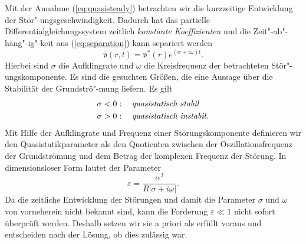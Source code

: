 \documentclass[10pt,a5paper,oneside,draft]{book}
\numberwithin{equation}{chapter}
\begin{document}
Mit der Annahme (\mbox{\ref{eq:quasisteady}}) betrachten wir die kurzzeitige Entwicklung der St\"or"-ungsgeschwindigkeit.
Dadurch hat das partielle Differentialgleichungssystem zeitlich \textit{konstante Koeffizienten} und die Zeit"-ab"-h\"ang"-ig"-keit aus (\mbox{\ref{eq:separation}}) kann separiert werden
\begin{equation}\label{eq:zeitansatz}
	\bar{\mathfrak{v}}(r,t) = \mathfrak{v}^{*}(r) e^{(\sigma + i\omega)t}.
\end{equation}
Hierbei sind $\sigma$ die Aufklingrate und $\omega$ die Kreisfrequenz der betrachteten St\"or"-ungskomponente.
Es sind die gesuchten Gr\"o\ss en, die eine Aussage \"uber die Stabilit\"at der Grundstr\"o"-mung liefern.
Es gilt
\begin{equation}\label{eq:quasistatisch:kriterium}
	\begin{split}
	\sigma &< 0:\quad\textrm{\textit{quasistatisch stabil}}\\
	\sigma &> 0:\quad\textrm{\textit{quasistatisch instabil}}.
	\end{split}
\end{equation}
Mit Hilfe der Aufklingrate und Frequenz einer St\"orungskomponente definieren wir den Quasistatikparameter als den Quotienten zwischen der Oszillationsfrequenz der Grundstr\"omung und dem Betrag der komplexen Frequenz der St\"orung.
In dimensionsloser Form lautet der Parameter
\begin{equation}\label{eq:epsilon}
	\varepsilon = \frac{\alpha^2}{R|\sigma+i\omega|}.
\end{equation}
Da die zeitliche Entwicklung der St\"orungen und damit die Parameter $\sigma$ und $\omega$ von vorneherein nicht bekannt sind, kann die Forderung $\varepsilon\ll1$ nicht sofort \"uberpr\"uft werden.
Deshalb setzen wir sie a priori als erf\"ullt voraus und entscheiden nach der L\"osung, ob dies zul\"assig war.\\
\end{document}
